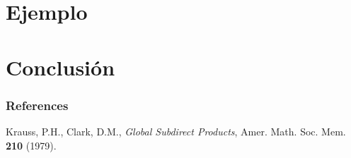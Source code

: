\documentclass[12pt]{beamer}
\begin{document}
\section{Ejemplo}
\begin{frame}
\end{frame}

\section{Conclusión}
\begin{frame}
\end{frame}



\begin{frame}%
\frametitle{References}

\begin{thebibliography}{CamVag2009}

{}\textrm{Krauss, P.H., Clark, D.M.}, 
\textit{Global Subdirect Products}, Amer. Math. Soc. Mem. \textbf{210} (1979).


\end{thebibliography}

\end{frame}

\begin{frame}
\begin{figure}[center]
\end{figure}
\end{frame}
\end{document}
